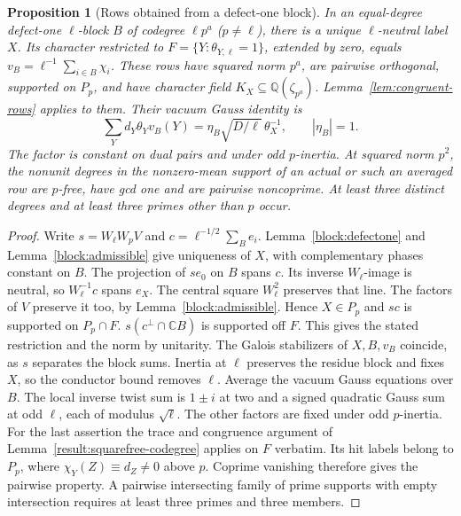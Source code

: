 \documentclass[11pt]{amsart}
\numberwithin{equation}{section}
\newtheorem{proposition}[theorem]{Proposition}
\theoremstyle{definition}
\theoremstyle{plain}
\newcommand{\QQ}{\mathbb Q}
\begin{document}
\begin{proposition}[Rows obtained from a defect-one block]\label{result:effective}
In an equal-degree defect-one $\ell$-block $B$ of codegree $\ell p^a$
($p\ne\ell$), there is a unique $\ell$-neutral label $X$. Its character
restricted to $F=\{Y:\theta_{Y,\ell}=1\}$, extended by zero, equals
$v_B=\ell^{-1}\sum_{i\in B}\chi_i$. These rows have squared norm $p^a$,
are pairwise orthogonal, supported on $P_p$, and have character field
$K_X\subseteq\QQ(\zeta_{p^a})$. Lemma~\ref{lem:congruent-rows}
applies to them. Their vacuum Gauss identity is
\begin{equation}
\sum_Yd_Y\theta_Yv_B(Y)=\eta_B\sqrt{D/\ell}\,\theta_X^{-1},
\qquad |\eta_B|=1 .
\end{equation}
The factor is constant on dual pairs and under odd $p$-inertia.
At squared norm $p^2$, the nonunit degrees in the nonzero-mean
support of an actual or such an averaged row are $p$-free, have gcd
one and are pairwise noncoprime. At least three distinct degrees
and at least three primes other than $p$ occur.
\end{proposition}
\begin{proof}
Write $s=W_\ell W_pV$ and $c=\ell^{-1/2}\sum_Be_i$.
Lemma~\ref{block:defectone} and Lemma~\ref{block:admissible} give uniqueness
of $X$, with complementary phases constant on $B$. The projection
of $se_0$ on $B$ spans $c$. Its inverse $W_\ell$-image is neutral,
so $W_\ell^{-1}c$ spans $e_X$. The central square $W_\ell^2$ preserves
that line. The factors of $V$ preserve it too, by
Lemma~\ref{block:admissible}. Hence $X\in P_p$ and $sc$ is supported
on $P_p\cap F$. $s(c^\perp\cap\mathbb C B)$ is supported off $F$.
This gives the stated restriction and the norm by unitarity.
The Galois stabilizers of $X,B,v_B$ coincide, as $s$ separates
the block sums. Inertia at $\ell$ preserves the residue block and
fixes $X$, so the conductor bound removes $\ell$. Average the vacuum
Gauss equations over $B$. The local inverse twist sum is $1\pm i$
at two and a signed quadratic Gauss sum at odd $\ell$, each of modulus
$\sqrt\ell$. The other factors are fixed under odd $p$-inertia.
For the last assertion the trace and congruence argument of
Lemma~\ref{result:squarefree-codegree} applies on $F$ verbatim. Its hit labels
belong to $P_p$, where $\chi_Y(Z)\equiv d_Z\ne0$ above $p$.
Coprime vanishing therefore gives the pairwise property. A pairwise
intersecting family of prime supports with empty intersection requires
at least three primes and three members.
\end{proof}
\end{document}
